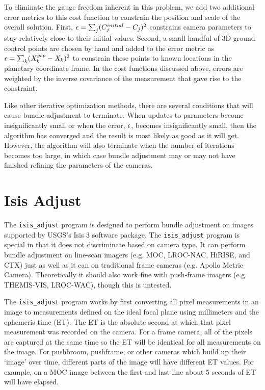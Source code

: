 To eliminate the gauge freedom inherent in this problem, we add two
additional error metrics to this cost function to constrain the position
and scale of the overall solution. First, ${\bf \epsilon} =
\sum_j(C_j^{initial}-C_j)^2$ constrains camera parameters to stay
relatively close to their initial values.  Second, a small handful of
3D ground control points are chosen by hand and added to the
error metric as ${\bf \epsilon} = \sum_k(X_k^{gcp}-X_k)^2$ to
constrain these points to known locations in the planetary coordinate
frame.  In the cost functions discussed above, errors are weighted by
the inverse covariance of the measurement that gave rise to the
constraint.

Like other iterative optimization methods, there are several
conditions that will cause bundle adjustment to terminate.  When
updates to parameters become insignificantly small or when the error,
${\bf \epsilon}$, becomes insignificantly small, then the algorithm
has converged and the result is most likely as good as it will get.
However, the algorithm will also terminate when the number of
iterations becomes too large, in which case bundle adjustment may or
may not have finished refining the parameters of the cameras.

\section{Isis Adjust}

The \texttt{isis\_adjust} program is designed to perform bundle
adjustment on images supported by USGS's Isis 3 software package.
The \texttt{isis\_adjust} program is special in that it does not
discriminate based on camera type. It can perform bundle adjustment
on line-scan imagers (e.g. MOC, LROC-NAC, HiRISE, and CTX) just
as well as it can on traditional frame cameras (e.g. Apollo
Metric Camera).  Theoretically it should also work fine with
push-frame imagers (e.g. THEMIS-VIS, LROC-WAC), though this is untested.

The \texttt{isis\_adjust} program works by first converting all
pixel measurements in an image to measurements defined on the ideal
focal plane using millimeters and the ephemeris time (ET). The ET
is the absolute second at which that pixel measurement was recorded
on the camera.  For a frame camera, all of the pixels are captured
at the same time so the ET will be identical for all measurements
on the image.  For pushbroom, pushframe, or other cameras which
build up their `image' over time, different parts of the image will
have different ET values.  For example, on a MOC image between the
first and last line about 5 seconds of ET will have elapsed.


